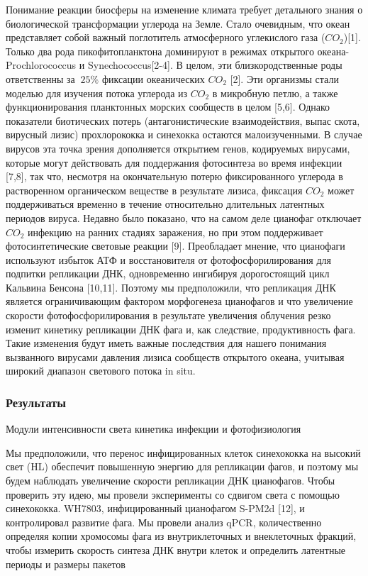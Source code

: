 \documentclass[a4paper,12pt]{article}
\begin{document}
        \par{Понимание реакции биосферы на изменение климата требует детального знания о биологической трансформации
        углерода на Земле. Стало очевидным, что океан представляет собой важный поглотитель атмосферного углекислого газа
        ($CO_2$)[1]. Только два рода пикофитопланктона доминируют в режимах открытого океана-Prochlorococcus и
        Synechococcus[2-4]. В целом, эти близкородственные роды ответственны за $ ~25\% $ фиксации океанических $CO_2$
        [2]. Эти организмы стали моделью для изучения потока углерода из $CO_2$ в микробную петлю, а также
        функционирования планктонных морских сообществ в целом [5,6]. Однако показатели биотических потерь
        (антагонистические взаимодействия, выпас скота, вирусный лизис) прохлорококка и синехокка остаются
        малоизученными. В случае вирусов эта точка зрения дополняется открытием генов, кодируемых вирусами, которые могут
        действовать для поддержания фотосинтеза во время инфекции [7,8], так что, несмотря на окончательную потерю
        фиксированного углерода в растворенном органическом веществе в результате лизиса, фиксация $CO_2$ может
        поддерживаться временно в течение относительно длительных латентных периодов вируса. Недавно было показано, что
        на самом деле цианофаг отключает $CO_2$ инфекцию на ранних стадиях заражения, но при этом поддерживает
        фотосинтетические световые реакции [9]. Преобладает мнение, что цианофаги используют избыток АТФ и восстановителя
        от фотофосфорилирования для подпитки репликации ДНК, одновременно ингибируя дорогостоящий цикл Кальвина Бенсона
        [10,11]. Поэтому мы предположили, что репликация ДНК является ограничивающим фактором морфогенеза цианофагов и
        что увеличение скорости фотофосфорилирования в результате увеличения облучения резко изменит кинетику репликации
        ДНК фага и, как следствие, продуктивность фага. Такие изменения будут иметь важные последствия для нашего
        понимания вызванного вирусами давления лизиса сообществ открытого океана, учитывая широкий диапазон светового
        потока in situ. \cite{puxty-evanx}}
\begin{center}
   \item \subsubsection{Результаты}
\end{center}
        {\Large Модули интенсивности света кинетика инфекции и фотофизиология}
            \par{Мы предположили, что перенос инфицированных клеток синехококка на высокий свет (HL) обеспечит
            повышенную энергию для репликации фагов, и поэтому мы будем наблюдать увеличение скорости репликации ДНК
            цианофагов. Чтобы проверить эту идею, мы провели эксперименты со сдвигом света с помощью синехококка.
            WH7803, инфицированный цианофагом S-PM2d [12], и контролировал развитие фага. Мы провели анализ qPCR,
            количественно определяя копии хромосомы фага из внутриклеточных и внеклеточных фракций, чтобы измерить
            скорость синтеза ДНК внутри клеток и определить латентные периоды и размеры пакетов}
\end{document}
